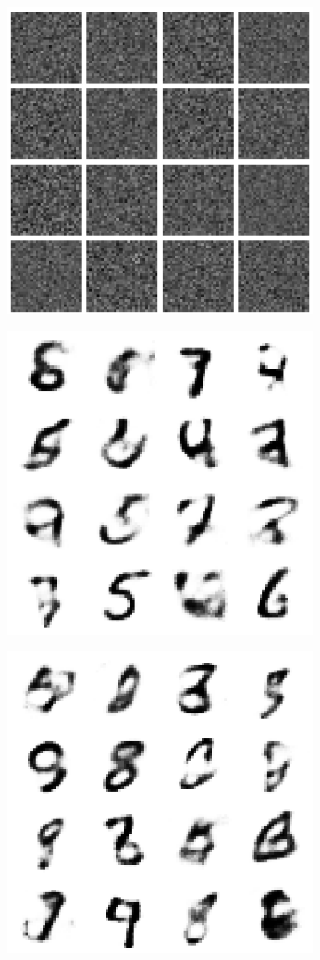 \documentclass{article}
\begin{document}
\begin{figure}[t]
\begin{subfigure}{0.32\textwidth}
\centering
\includegraphics[scale=0.25]{img/vae_mean_0}
\end{subfigure}
\begin{subfigure}{0.32\textwidth}
\centering
\includegraphics[scale=0.25]{img/vae_mean_20}
\end{subfigure}
\begin{subfigure}{0.32\textwidth}
\centering
\includegraphics[scale=0.25]{img/vae_mean_40}

\end{subfigure}
\end{figure}
\end{document}
